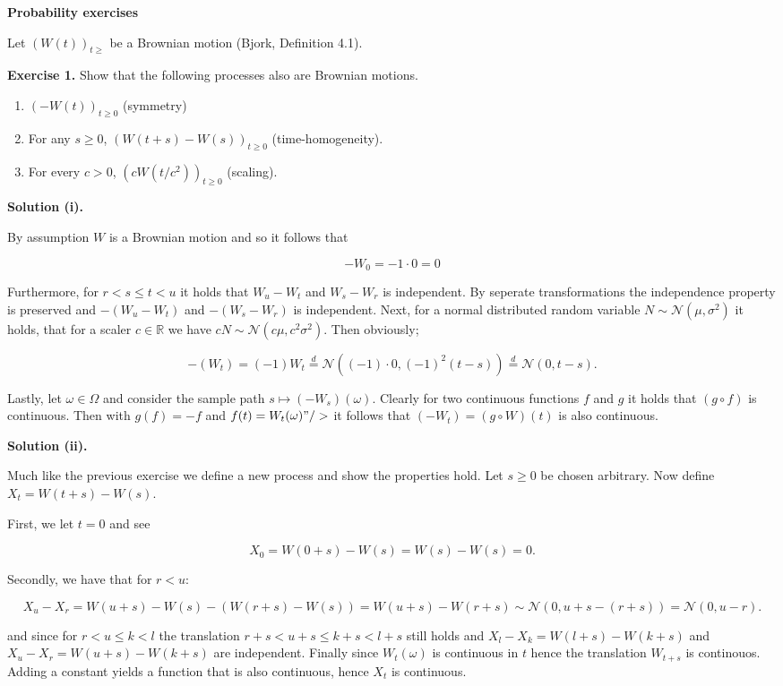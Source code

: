 \documentclass[
]{article}
\providecommand{\tightlist}{%
  \setlength{\itemsep}{0pt}\setlength{\parskip}{0pt}}
\begin{document}
\textbf{Probability exercises}

Let \((W(t))_{t\ge}\) be a Brownian motion (Bjork, Definition 4.1).

\textbf{Exercise 1.} Show that the following processes also are Brownian
motions.

\begin{enumerate}
\def\labelenumi{\roman{enumi}.}
\tightlist
\item
  \((-W(t))_{t\ge 0}\) (symmetry)
\item
  For any \(s\ge 0\), \((W(t+s)-W(s))_{t\ge 0}\) (time-homogeneity).
\item
  For every \(c>0\), \((cW(t/c^2))_{t\ge 0}\) (scaling).
\end{enumerate}

\textbf{Solution (i).}

By assumption \(W\) is a Brownian motion and so it follows that

\[-W_0=-1\cdot0=0\]

Furthermore, for \(r<s\le t< u\) it holds that \(W_u-W_t\) and
\(W_s-W_r\) is independent. By seperate transformations the independence
property is preserved and \(-(W_u-W_t)\) and \(-(W_s-W_r)\) is
independent. Next, for a normal distributed random variable
\(N\sim\mathcal{N}(\mu,\sigma^2)\) it holds, that for a scaler
\(c\in\mathbb{R}\) we have \(c N\sim\mathcal{N}(c\mu,c^2\sigma ^2)\).
Then obviously;

\[-(W_t)=(-1)W_t\stackrel{d}{=}\mathcal{N}((-1)\cdot0,(-1)^2(t-s))\stackrel{d}{=}\mathcal{N}( 0,t-s).\]

Lastly, let \(\omega \in \Omega\) and consider the sample path
\(s\mapsto (-W_s)(\omega)\). Clearly for two continuous functions \(f\)
and \(g\) it holds that \((g\circ f)\) is continuous. Then with
\(g(f)=-f\) and \(f(t)=W_t(\omega)"/>\) it follows that
\((-W_t)=(g\circ W)(t)\) is also continuous.

\textbf{Solution (ii).}

Much like the previous exercise we define a new process and show the
properties hold. Let \(s\ge 0\) be chosen arbitrary. Now define
\(X_t=W(t+s)-W(s)\).

First, we let \(t=0\) and see

\[X_0=W(0+s)-W(s)=W(s)-W(s)=0.\]

Secondly, we have that for \(r<u\):

\[X_u-X_r=W(u+s)-W(s)-(W(r+s)-W(s))=W(u+s)-W(r+s)\sim \mathcal{N}(0,u+s-(r+s))=\mathcal{N}(0,u-r).\]

and since for \(r<u\le k<l\) the translation \(r+s<u+s\le k+s<l+s\)
still holds and \(X_l-X_k=W(l+s)-W(k+s)\) and \(X_u-X_r=W(u+s)-W(k+s)\)
are independent. Finally since \(W_t(\omega)\) is continuous in \(t\)
hence the translation \(W_{t+s}\) is continouos. Adding a constant
yields a function that is also continuous, hence \(X_t\) is continuous.
\end{document}
